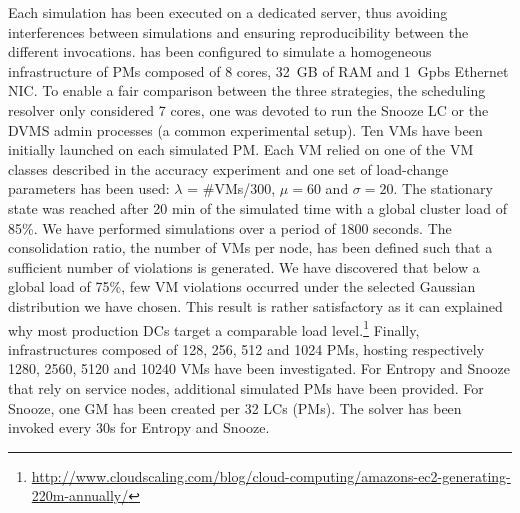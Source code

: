 Each simulation has been executed on a dedicated server, thus
avoiding interferences between simulations and ensuring
reproducibility between the different invocations.
%
\vmps has been configured to simulate a homogeneous infrastructure of
PMs composed of 8 cores, 32~GB of RAM and 1~Gpbs Ethernet NIC. To
enable a fair comparison between the three strategies, the scheduling
resolver only considered 7 cores, \ie one was devoted to run the
Snooze LC or the DVMS admin processes (a common experimental setup).
Ten VMs have been initially launched on each simulated PM. Each VM
relied on one of the VM classes described in the accuracy experiment
and one set of load-change parameters has been used: $\lambda$ =
\#VMs/300, $\mu = 60$ and $\sigma = 20$. The stationary state was
reached after 20 min of the simulated time with a global cluster load
of 85\%.
We have performed simulations over a period of 1800 seconds. The
consolidation ratio, \ie the number of VMs per node, has been defined
such that a sufficient number of violations is generated. We have
discovered that below a global load of 75\%, few VM violations occurred
under the selected Gaussian distribution we have chosen. This result
is rather satisfactory as it can explained why most production DCs
target a comparable load
level.\footnote{\url{http://www.cloudscaling.com/blog/cloud-computing/amazons-ec2-generating-220m-annually/}}
Finally, infrastructures composed of 128, 256, 512 and 1024 PMs,
hosting respectively 1280, 2560, 5120 and 10240 VMs have been
investigated. For Entropy and Snooze that rely on service nodes,
additional simulated PMs have been provided. For Snooze, one GM has
been created per 32 LCs (\ie PMs). The solver has been invoked
every 30s for Entropy and Snooze.
%
